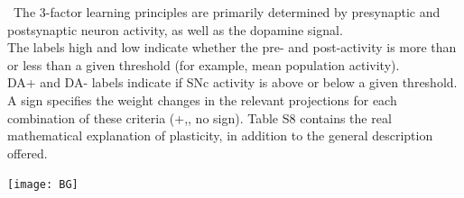 \documentclass[portrait,final,a0paper,fontscale=0.33]{baposter}
\begin{document}
\begin{poster}
{\begin{adjustbox}{minipage=0.95\textwidth, margin=5pt, center}
		\begin{minipage}[t]{\textwidth}
			\begin{multicols}{2}
			\
			The 3-factor learning principles are primarily determined by presynaptic and postsynaptic neuron activity, as well as the dopamine signal. \\
			The labels high and low indicate whether the pre- and post-activity is more than or less than a given threshold (for example, mean population activity). \\
			DA+ and DA- labels indicate if SNc activity is above or below a given threshold. A sign specifies the weight changes in the relevant projections for each combination of these criteria (+,, no sign). Table S8 contains the real mathematical explanation of plasticity, in addition to the general description offered. 
			\end{multicols}
			\vspace{2pt}
		\end{minipage}
		\hfill
	
		\begin{minipage}[r]{0.48\textwidth}
			\raggedleft
			\texttt{[image: BG]}
		\end{minipage}
		\hfill
		\begin{minipage}[l]{0.49\textwidth}
			
		\end{minipage}
	\end{adjustbox}

}

\end{poster}
\end{document}
